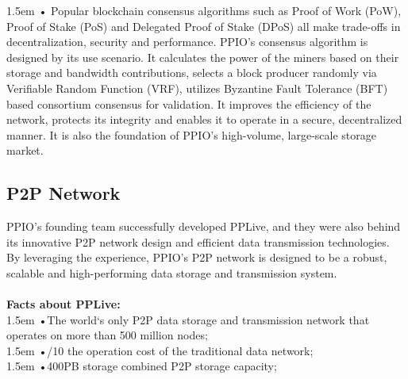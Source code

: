 \documentclass[10pt,a4paper]{article}
\begin{document}
\hangindent 1.5em
\noindent   
• Popular blockchain consensus algorithms such as Proof of Work (PoW), Proof of Stake (PoS) and Delegated Proof of Stake (DPoS) all make trade-offs in decentralization, security and performance. PPIO's consensus algorithm is designed by its use scenario. It calculates the power of the miners based on their storage and bandwidth contributions, selects a block producer randomly via Verifiable Random Function (VRF)\cite{article24}\cite{article25}, utilizes Byzantine Fault Tolerance (BFT) based consortium consensus for validation. It improves the efficiency of the network, protects its integrity and enables it to operate in a secure, decentralized manner. It is also the foundation of PPIO's high-volume, large-scale storage market.
\vspace{-0.5em}

      \subsection{P2P Network} %
PPIO's founding team successfully developed PPLive, and they were also behind its innovative P2P network design and efficient data transmission technologies\cite{article4}\cite{article5}\cite{article6}\cite{article7}. By leveraging the experience, PPIO's P2P network is designed to be a robust, scalable and high-performing data storage and transmission system. 
\vspace{-0.5em}
\\ \\{\bf Facts about PPLive:}
\vspace{-0.8em}
\\ 

\hangindent 1.5em
\noindent   
•\quad The world‘s only P2P data storage and transmission network that operates on more than 500 million nodes;
\vspace{-0.8em}
\\ 

\hangindent 1.5em
\noindent   
•/10 the operation cost of the traditional data network;
\vspace{-0.8em}
\\ 

\hangindent 1.5em
\noindent   
•\quad 400PB storage combined P2P storage capacity;
\vspace{-0.5em}
\end{document}
